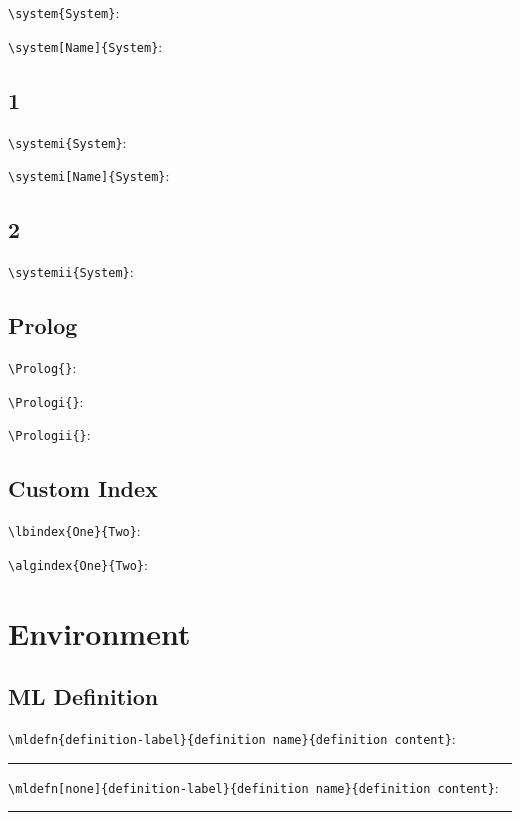 \documentclass{article}
\begin{document}
\verb|\system{System}|:

\verb|\system[Name]{System}|:

\subsection{1}

\verb|\systemi{System}|:

\verb|\systemi[Name]{System}|:

\subsection{2}

\verb|\systemii{System}|:

\subsection{Prolog}

\verb|\Prolog{}|:
\Prolog{}

\verb|\Prologi{}|:
\Prologi{}

\verb|\Prologii{}|:
\Prologii{}

\subsection{Custom Index}

\verb|\lbindex{One}{Two}|:

\verb|\algindex{One}{Two}|:

\section{Environment}

\subsection{ML Definition}

\verb|\mldefn{definition-label}{definition name}{definition content}|:

\rule{2pt}{\pagewidth}

\verb|\mldefn[none]{definition-label}{definition name}{definition content}|:

\rule{2pt}{\pagewidth}
\end{document}
